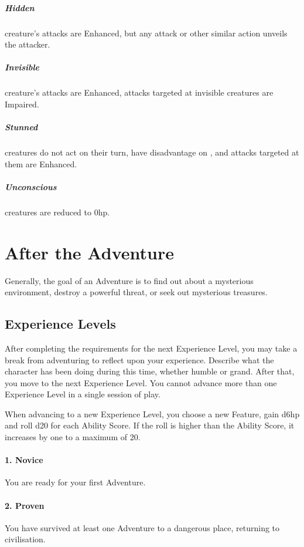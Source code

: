 \documentclass[itdr]{subfiles}
\begin{document}
\vfill
{}
\subparagraph{Hidden} creature's attacks are Enhanced, but any attack or other similar action unveils the attacker.

\vfill
{}
\subparagraph{Invisible} creature's attacks are Enhanced, attacks targeted at invisible creatures are Impaired.

\vfill
{}
\subparagraph{Stunned} creatures do not act on their turn, have disadvantage on , and attacks targeted at them are Enhanced.

\vfill
{}
\subparagraph{Unconscious} creatures are reduced to 0hp.

\vfill
\break

\section{After the Adventure}

Generally, the goal of an Adventure is to find out about a mysterious environment, destroy a powerful threat, or seek out mysterious treasures.

\vfill
\subsection{Experience Levels}
After completing the requirements for the next Experience Level, you may take a break from adventuring to reflect upon your experience. Describe what the character has been doing during this time, whether humble or grand. After that, you move to the next Experience Level. You cannot advance more than one Experience Level in a single session of play.

When advancing to a new Experience Level, you choose a new Feature, gain d6hp and roll d20 for each Ability Score. If the roll is higher than the Ability Score, it increases by one to a maximum of 20.

\vfill
\paragraph{1. Novice}
You are ready for your first Adventure.

\vfill
\paragraph{2. Proven}
You have survived at least one Adventure to a dangerous place, returning to civilisation.
\end{document}
